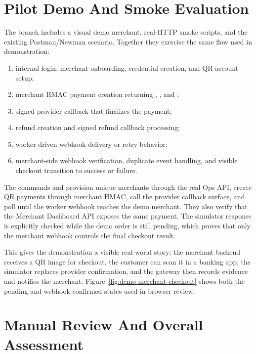 \section{Pilot Demo And Smoke Evaluation}

The branch includes a visual demo merchant, real-HTTP smoke scripts, and the
existing Postman/Newman scenario. Together they exercise the same flow used in
demonstration:

\begin{enumerate}
  \item internal login, merchant onboarding, credential creation, and QR account
  setup;
  \item merchant HMAC payment creation returning ,
  , and ;
  \item signed provider callback that finalizes the payment;
  \item refund creation and signed refund callback processing;
  \item worker-driven webhook delivery or retry behavior;
  \item merchant-side webhook verification, duplicate event handling, and
  visible checkout transition to success or failure.
\end{enumerate}

The commands  and
 provision unique merchants
through the real Ops API, create QR payments through merchant HMAC, call the
provider callback surface, and poll until the worker webhook reaches the demo
merchant. They also verify that the Merchant Dashboard API exposes the same
payment. The simulator response is explicitly checked while the demo order is
still pending, which proves that only the merchant webhook controls the final
checkout result.

This gives the demonstration a visible real-world story: the merchant backend
receives a QR image for checkout, the customer can scan it in a banking app,
the simulator replaces provider confirmation, and the gateway then records
evidence and notifies the merchant. Figure~\ref{fig:demo-merchant-checkout}
shows both the pending and webhook-confirmed states used in browser review.

\section{Manual Review And Overall Assessment}

